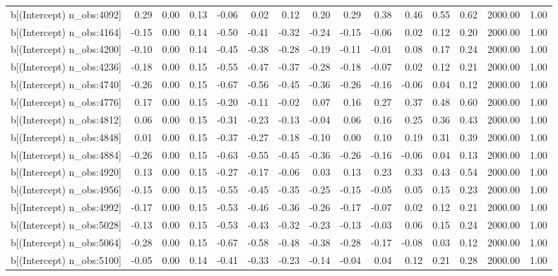 \begin{table}[ht]
\begin{tabular}{rrrrrrrrrrrrrrr}
  b[(Intercept) n\_obs:4092] & 0.29 & 0.00 & 0.13 & -0.06 & 0.02 & 0.12 & 0.20 & 0.29 & 0.38 & 0.46 & 0.55 & 0.62 & 2000.00 & 1.00 \\ 
  b[(Intercept) n\_obs:4164] & -0.15 & 0.00 & 0.14 & -0.50 & -0.41 & -0.32 & -0.24 & -0.15 & -0.06 & 0.02 & 0.12 & 0.20 & 2000.00 & 1.00 \\ 
  b[(Intercept) n\_obs:4200] & -0.10 & 0.00 & 0.14 & -0.45 & -0.38 & -0.28 & -0.19 & -0.11 & -0.01 & 0.08 & 0.17 & 0.24 & 2000.00 & 1.00 \\ 
  b[(Intercept) n\_obs:4236] & -0.18 & 0.00 & 0.15 & -0.55 & -0.47 & -0.37 & -0.28 & -0.18 & -0.07 & 0.02 & 0.12 & 0.21 & 2000.00 & 1.00 \\ 
  b[(Intercept) n\_obs:4740] & -0.26 & 0.00 & 0.15 & -0.67 & -0.56 & -0.45 & -0.36 & -0.26 & -0.16 & -0.06 & 0.04 & 0.12 & 2000.00 & 1.00 \\ 
  b[(Intercept) n\_obs:4776] & 0.17 & 0.00 & 0.15 & -0.20 & -0.11 & -0.02 & 0.07 & 0.16 & 0.27 & 0.37 & 0.48 & 0.60 & 2000.00 & 1.00 \\ 
  b[(Intercept) n\_obs:4812] & 0.06 & 0.00 & 0.15 & -0.31 & -0.23 & -0.13 & -0.04 & 0.06 & 0.16 & 0.25 & 0.36 & 0.43 & 2000.00 & 1.00 \\ 
  b[(Intercept) n\_obs:4848] & 0.01 & 0.00 & 0.15 & -0.37 & -0.27 & -0.18 & -0.10 & 0.00 & 0.10 & 0.19 & 0.31 & 0.39 & 2000.00 & 1.00 \\ 
  b[(Intercept) n\_obs:4884] & -0.26 & 0.00 & 0.15 & -0.63 & -0.55 & -0.45 & -0.36 & -0.26 & -0.16 & -0.06 & 0.04 & 0.13 & 2000.00 & 1.00 \\ 
  b[(Intercept) n\_obs:4920] & 0.13 & 0.00 & 0.15 & -0.27 & -0.17 & -0.06 & 0.03 & 0.13 & 0.23 & 0.33 & 0.43 & 0.54 & 2000.00 & 1.00 \\ 
  b[(Intercept) n\_obs:4956] & -0.15 & 0.00 & 0.15 & -0.55 & -0.45 & -0.35 & -0.25 & -0.15 & -0.05 & 0.05 & 0.15 & 0.23 & 2000.00 & 1.00 \\ 
  b[(Intercept) n\_obs:4992] & -0.17 & 0.00 & 0.15 & -0.53 & -0.46 & -0.36 & -0.26 & -0.17 & -0.07 & 0.02 & 0.12 & 0.21 & 2000.00 & 1.00 \\ 
  b[(Intercept) n\_obs:5028] & -0.13 & 0.00 & 0.15 & -0.53 & -0.43 & -0.32 & -0.23 & -0.13 & -0.03 & 0.06 & 0.15 & 0.24 & 2000.00 & 1.00 \\ 
  b[(Intercept) n\_obs:5064] & -0.28 & 0.00 & 0.15 & -0.67 & -0.58 & -0.48 & -0.38 & -0.28 & -0.17 & -0.08 & 0.03 & 0.12 & 2000.00 & 1.00 \\ 
  b[(Intercept) n\_obs:5100] & -0.05 & 0.00 & 0.14 & -0.41 & -0.33 & -0.23 & -0.14 & -0.04 & 0.04 & 0.12 & 0.21 & 0.28 & 2000.00 & 1.00 \\ 

\end{tabular}
\end{table}

